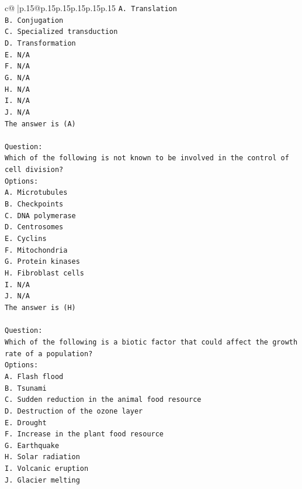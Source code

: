 \documentclass{article}
\begin{document}
{\begin{supertabular}{c@{$\;$}|p{.15\linewidth}@{}p{.15\linewidth}p{.15\linewidth}p{.15\linewidth}p{.15\linewidth}p{.15\linewidth}}
{{{\texttt{A. Translation} \\
\texttt{B. Conjugation} \\
\texttt{C. Specialized transduction} \\
\texttt{D. Transformation} \\
\texttt{E. N/A} \\
\texttt{F. N/A} \\
\texttt{G. N/A} \\
\texttt{H. N/A} \\
\texttt{I. N/A} \\
\texttt{J. N/A} \\
\texttt{The answer is (A)} \\
\\ 
\texttt{Question:} \\
\texttt{Which of the following is not known to be involved in the control of cell division?} \\
\texttt{Options:} \\
\texttt{A. Microtubules} \\
\texttt{B. Checkpoints} \\
\texttt{C. DNA polymerase} \\
\texttt{D. Centrosomes} \\
\texttt{E. Cyclins} \\
\texttt{F. Mitochondria} \\
\texttt{G. Protein kinases} \\
\texttt{H. Fibroblast cells} \\
\texttt{I. N/A} \\
\texttt{J. N/A} \\
\texttt{The answer is (H)} \\
\\ 
\texttt{Question:} \\
\texttt{Which of the following is a biotic factor that could affect the growth rate of a population?} \\
\texttt{Options:} \\
\texttt{A. Flash flood} \\
\texttt{B. Tsunami} \\
\texttt{C. Sudden reduction in the animal food resource} \\
\texttt{D. Destruction of the ozone layer} \\
\texttt{E. Drought} \\
\texttt{F. Increase in the plant food resource} \\
\texttt{G. Earthquake} \\
\texttt{H. Solar radiation} \\
\texttt{I. Volcanic eruption} \\
\texttt{J. Glacier melting} \\
            }
        }
    }
     \\ \\


\end{supertabular}}
\end{document}
